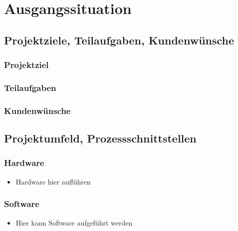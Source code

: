 \chapter{Ausgangssituation}


\section{Projektziele, Teilaufgaben, Kundenw\"unsche }
\subsection{Projektziel}
\subsection{Teilaufgaben}

\subsection{Kundenwünsche}
\section{Projektumfeld, Prozessschnittstellen}
\subsection{Hardware}
\begin{itemize}
	\item Hardware hier auff\"uhren
\end{itemize}

\subsection{Software}
\begin{itemize}
	\item Hier kann Software aufgef\"uhrt werden
\end{itemize}
